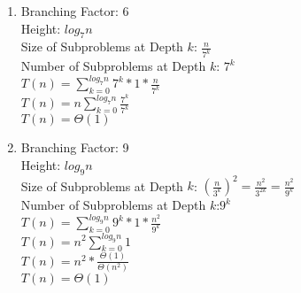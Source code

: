 \documentclass[11pt]{article}
\newenvironment{qparts}{\begin{enumerate}[{(}a{)}]}{\end{enumerate}}
\begin{document}
\begin{qparts}
\item
Branching Factor: 6\\
Height: $log_{7}n$\\
Size of Subproblems at Depth $k$: $\frac{n}{7^{k}}$\\
Number of Subproblems at Depth $k$: $7^{k}$\\
$T(n) = \sum_{k=0}^{log_{7}n} 7^{k} * 1 * \frac{n}{7^{k}}$\\
$T(n) = n \sum_{k=0}^{log_{7}n} \frac{7^{k}}{7^{k}}$\\
$T(n) = \Theta(1)$

\item
Branching Factor: 9\\
Height: $log_{9}n$\\
Size of Subproblems at Depth $k$: $(\frac{n}{3^{k}})^{2} = \frac{n^{2}}{3^{2k}} = \frac{n^2}{9^k}$\\
Number of Subproblems at Depth $k$:$9^k$\\
$T(n) = \sum_{k=0}^{log_{9}n} 9^{k} * 1 * \frac{n^2}{9^{k}}$\\
$T(n) = n^{2} \sum_{k=0}^{log_{9}n}  1 $\\
$T(n) = n^{2} * \frac{\Theta(1)}{\Theta(n^2)}$\\
$T(n) = \Theta(1)$






\end{qparts}

\newpage
\end{document}
